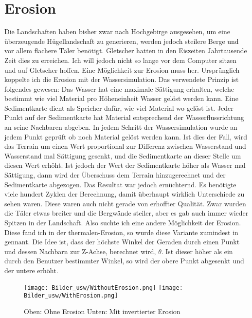 \documentclass[12pt,twoside]{book}
\begin{document}
\section{Erosion}
Die Landschaften haben bisher zwar nach Hochgebirge ausgesehen, um eine \"uberzeugende H\"ugellandschaft zu generieren, werden jedoch steilere Berge und vor allem flachere T\"aler ben\"otigt. Gletscher hatten in den Eiszeiten Jahrtausende Zeit dies zu erreichen. Ich will jedoch nicht so lange vor dem Computer sitzen und auf Gletscher hoffen. Eine M\"oglichkeit zur Erosion muss her.
Urspr\"unglich koppelte ich die Erosion mit der Wassersimulation. Das verwendete Prinzip ist folgendes gewesen:
Das Wasser hat eine maximale S\"attigung erhalten, welche bestimmt wie viel Material pro H\"oheneinheit  Wasser gel\"ost werden kann.
Eine Sedimentkarte dient als Speicher daf\"ur, wie viel Material wo gel\"ost ist. Jeder Punkt auf der Sedimentkarte hat Material entsprechend der Wasserflussrichtung an seine Nachbaren abgeben.
In jedem Schritt der Wassersimulation wurde an jedem Punkt gepr\"uft ob noch Material gel\"ost werden kann. Ist dies der Fall, wird das Terrain um einen Wert proportional zur Differenz zwischen Wasserstand und Wasserstand mal S\"attigung gesenkt, und die Sedimentkarte an dieser Stelle um diesen Wert erh\"oht.
Ist jedoch der Wert der Sedimentkarte h\"oher als Wasser mal S\"attigung, dann wird der \"Uberschuss dem Terrain hinzugerechnet und der Sedimentkarte abgezogen.
Das Resultat war jedoch ern\"uchternd. Es ben\"otigte viele hundert Zyklen der Berechnung, damit \"uberhaupt wirklich Unterschiede zu sehen waren. Diese waren auch nicht gerade von erhoffter Qualit\"at. Zwar wurden die T\"aler etwas breiter und die Bergw\"ande steiler, aber es gab auch immer wieder Spitzen in der Landschaft.
Also suchte ich eine andere M\"oglichkeit der Erosion. 
Diese fand ich in der \glqq thermalen\grqq-Erosion, so wurde diese Variante zumindest in \cite{erosion} gennant.
Die Idee ist, dass der h\"ochste Winkel der Geraden durch einen Punkt und dessen Nachbarn zur Z-Achse, berechnet wird, \( \theta\). Ist dieser h\"oher als ein durch den Benutzer bestimmter Winkel, so wird der obere Punkt abgesenkt und der untere erh\"oht.

\begin{figure}[H]
  \centering
  
 \texttt{[image: Bilder\_usw/WithoutErosion.png]}
   \centering
 \texttt{[image: Bilder\_usw/WithErosion.png]}
   \centering
 \caption{Oben: Ohne Erosion Unten: Mit invertierter Erosion}
  \centering
  \label{fig:Erosions}
\end{figure}
\end{document}
